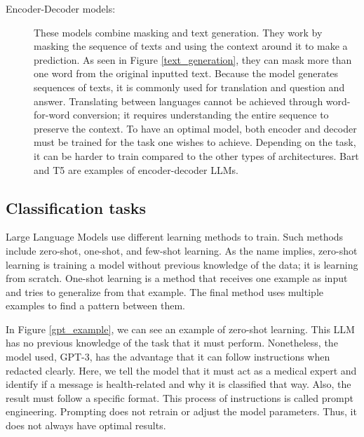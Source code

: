 \begin{description}
\item[Encoder-Decoder models:] These models combine masking and text generation. They work by masking the sequence of texts and using the context around it to make a prediction. As seen
in Figure \ref{text_generation}, they can mask more than one word from the original inputted text. Because the model generates sequences of texts, it is commonly used for translation
and question and answer. Translating between languages cannot be achieved through word-for-word conversion; it requires understanding the entire sequence to preserve the context.
To have an optimal model, both encoder and decoder must be trained for the task one wishes to achieve. Depending on the task, it can be harder to train compared to the other types of architectures.
Bart \cite{lewis2019bartdenoisingsequencetosequencepretraining} and T5 \cite{2020t5} are examples of encoder-decoder LLMs.

\end{description}

\subsection{Classification tasks}
Large Language Models use different learning methods to train. Such methods include zero-shot, one-shot, and few-shot learning. As the name implies, zero-shot learning is training a model without
previous knowledge of the data; it is learning from scratch. One-shot learning is a method that receives one example as input and tries to generalize from that example. The final method uses
multiple examples to find a pattern between them. 

In Figure \ref{gpt_example}, we can see an example of zero-shot learning. This LLM has no previous knowledge of the task that it must perform. Nonetheless, the model used, GPT-3, has the 
advantage that it can follow instructions when redacted clearly. Here, we tell the model that it must act as a medical expert and identify if a message is health-related and why it is classified that way. 
Also, the result must follow a specific format. This process of instructions is called prompt engineering. Prompting does not retrain or adjust the model parameters. Thus, it does not always have optimal results.  
 
